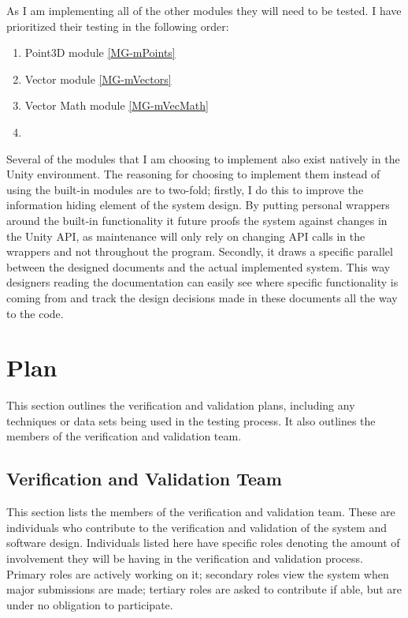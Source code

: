 \documentclass[12pt, titlepage]{article}
\begin{document}
As I am implementing all of the other modules they will need to be tested. I 
have prioritized their testing in the following order:

\begin{enumerate}
	\item Point3D module \ref{MG-mPoints}
	\item Vector module \ref{MG-mVectors}
	\item Vector Math module \ref{MG-mVecMath}
	\item 
\end{enumerate}

Several of the modules that I am choosing to implement also exist natively in 
the Unity environment. The reasoning for choosing to implement them instead of 
using the built-in modules are to two-fold; firstly, I do this to improve the 
information hiding element of the system design. By putting personal wrappers 
around the built-in functionality it future proofs the system against changes 
in the Unity API, as maintenance will only rely on changing API calls in the 
wrappers and not throughout the program. Secondly, it draws a specific parallel 
between the designed documents and the actual implemented system. This way 
designers reading the documentation can easily see where specific functionality 
is coming from and track the design decisions made in these documents all the 
way to the code.

\section{Plan}
This section outlines the verification and validation plans, including any 
techniques or data sets being used in the testing process. It also outlines the 
members of the verification and validation team.

\subsection{Verification and Validation Team}
This section lists the members of the verification and validation team. These 
are individuals who contribute to the verification and validation of the system 
and software design. Individuals listed here have specific roles denoting the 
amount of involvement they will be having in the verification and validation 
process. Primary roles are actively working on it; secondary roles view the 
system when major submissions are made; tertiary roles are asked to contribute 
if able, but are under no obligation to participate.
\end{document}
